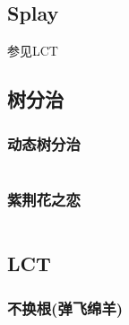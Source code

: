 \documentclass[a4paper]{article}
\begin{document}
\begin{multicols}{2}








			\subsection{Splay}
				参见LCT
			
			\subsection{树分治}

				
				\subsubsection{动态树分治}
					\inputminted{cpp}{../src/datastructure/动态树分治.cpp}

				\subsubsection{紫荆花之恋}
					\inputminted{cpp}{../src/datastructure/紫荆花之恋.cpp}

				\subsection{LCT}
					\subsubsection{不换根(弹飞绵羊)}
						\inputminted{cpp}{../src/datastructure/LCT(不换根).cpp}
				

\end{multicols}
\end{document}
